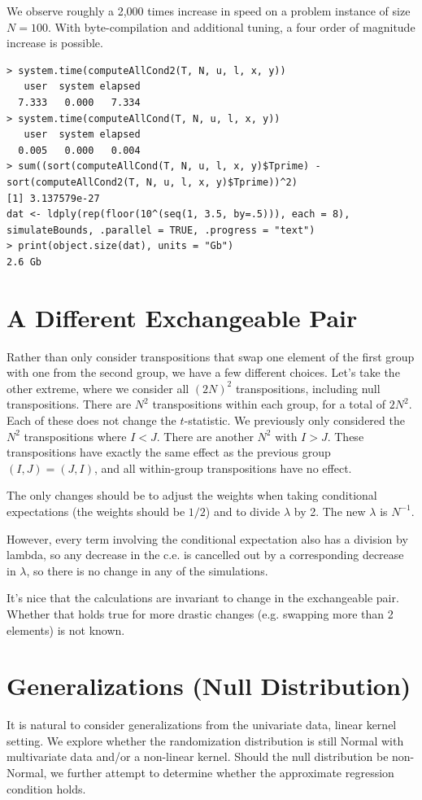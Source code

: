 We observe roughly a 2,000 times increase in speed on a problem instance of size $N=100$.  With
byte-compilation and additional tuning, a four order of magnitude increase is possible.
\begin{verbatim}
> system.time(computeAllCond2(T, N, u, l, x, y))
   user  system elapsed
  7.333   0.000   7.334
> system.time(computeAllCond(T, N, u, l, x, y))
   user  system elapsed
  0.005   0.000   0.004
> sum((sort(computeAllCond(T, N, u, l, x, y)$Tprime) - sort(computeAllCond2(T, N, u, l, x, y)$Tprime))^2)
[1] 3.137579e-27
dat <- ldply(rep(floor(10^(seq(1, 3.5, by=.5))), each = 8),
simulateBounds, .parallel = TRUE, .progress = "text")
> print(object.size(dat), units = "Gb")
2.6 Gb
\end{verbatim}

\section{A Different Exchangeable Pair}
Rather than only consider transpositions that swap one element of the
first group with one from the second group, we have a few different
choices.  Let's take the other extreme, where we consider all $(2N)^2$
transpositions, including null transpositions.  There are $N^2$
transpositions within each group, for a total of $2N^2$.  Each of
these does not change the $t$-statistic.  We previously only
considered the $N^2$ transpositions where $I < J$.  There are another
$N^2$ with $I > J$.  These transpositions have exactly the same effect
as the previous group $(I, J) = (J, I)$, and all within-group
transpositions have no effect.

The only changes should be to adjust the weights when taking
conditional expectations (the weights should be $1/2$) and to divide
$\lambda$ by 2.  The new $\lambda$ is $N^{-1}$.

However, every term involving the conditional expectation also has a
division by lambda, so any decrease in the c.e. is cancelled out by a
corresponding decrease in $\lambda$, so there is no change in any of
the simulations.

It's nice that the calculations are invariant to change in the
exchangeable pair.  Whether that holds true for more drastic changes
(e.g. swapping more than 2 elements) is not known.

\section{Generalizations (Null Distribution)}
It is natural to consider generalizations from the univariate data, linear
kernel setting.  We explore whether the randomization distribution is
still Normal with multivariate data and/or a non-linear kernel.
Should the null distribution be non-Normal, we further attempt to determine
whether the approximate regression condition holds.

